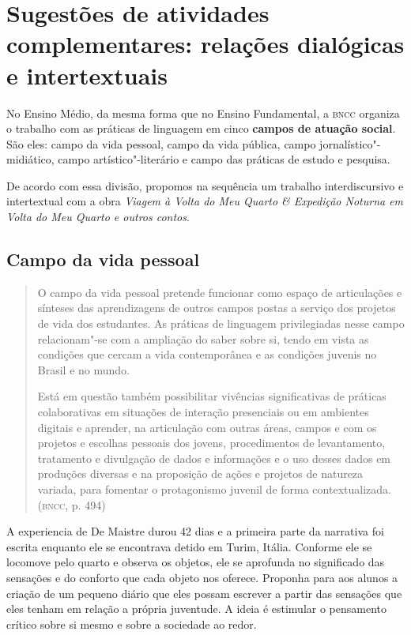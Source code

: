 \documentclass[12pt]{extarticle}
\begin{document}


\section{Sugestões de atividades complementares: relações dialógicas e
intertextuais}


No Ensino Médio, da mesma forma que no Ensino Fundamental, a \textsc{bncc}
organiza o trabalho com as práticas de linguagem em cinco \textbf{campos
de atuação social}. São eles: campo da vida pessoal, campo da vida
pública, campo jornalístico"-midiático, campo artístico"-literário e campo
das práticas de estudo e pesquisa.

De acordo com essa divisão, propomos na sequência um trabalho
interdiscursivo e intertextual com a obra \emph{Viagem à Volta do Meu
Quarto \& Expedição Noturna em Volta do Meu Quarto e outros contos}.

\subsection{Campo da vida pessoal}

\begin{quote}
O campo da vida pessoal pretende funcionar como espaço de articulações
e sínteses das aprendizagens de outros campos postas a serviço dos
projetos de vida dos estudantes. As práticas de linguagem privilegiadas
nesse campo relacionam"-se com a ampliação do saber sobre si, tendo em
vista as condições que cercam a vida contemporânea e as condições
juvenis no Brasil e no mundo.

Está em questão também possibilitar vivências significativas de práticas
colaborativas em situações de interação presenciais ou em ambientes
digitais e aprender, na articulação com outras áreas, campos e com os
projetos e escolhas pessoais dos jovens, procedimentos de levantamento,
tratamento e divulgação de dados e informações e o uso desses dados em
produções diversas e na proposição de ações e projetos de natureza
variada, para fomentar o protagonismo juvenil de forma
contextualizada. (\textsc{bncc}, p. 494)
\end{quote}

A experiencia de De Maistre durou 42 dias e a primeira parte da
narrativa foi escrita enquanto ele se encontrava detido em Turim,
Itália. Conforme ele se locomove pelo quarto e observa os objetos, ele
se aprofunda no significado das sensações e do conforto que cada
objeto nos oferece. Proponha para aos alunos a criação de um pequeno
diário que eles possam escrever a partir das sensações que eles tenham
em relação a própria juventude. A ideia é estimular o pensamento
crítico sobre si mesmo e sobre a sociedade ao redor.
\end{document}
